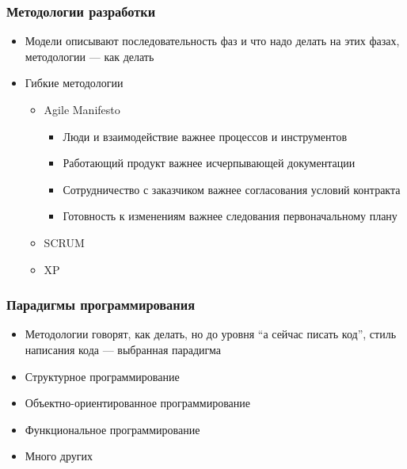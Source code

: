 \documentclass{../../slides-style}
\begin{document}
    \begin{frame}
        \frametitle{Методологии разработки}
        \begin{itemize}
            \item Модели описывают последовательность фаз и что надо делать на этих фазах, методологии --- как делать
            \item Гибкие методологии
            \begin{itemize}
                \item Agile Manifesto
                \begin{itemize}
                    \item Люди и взаимодействие важнее процессов и инструментов
                    \item Работающий продукт важнее исчерпывающей документации
                    \item Сотрудничество с заказчиком важнее согласования условий контракта
                    \item Готовность к изменениям важнее следования первоначальному плану
                \end{itemize}
                \item SCRUM
                \item XP
            \end{itemize}
        \end{itemize}
    \end{frame}

    \begin{frame}
        \frametitle{Парадигмы программирования}
        \begin{itemize}
            \item Методологии говорят, как делать, но до уровня ``а сейчас писать код'', стиль написания кода --- выбранная парадигма
            \item Структурное программирование
            \item Объектно-ориентированное программирование
            \item Функциональное программирование
            \item Много других
        \end{itemize}
    \end{frame}
\end{document}
